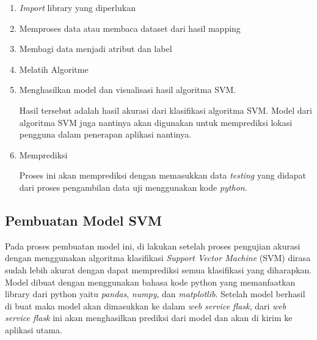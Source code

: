 \begin{enumerate}[1.]
	\itemsep0em
	\item \textit{Import} library yang diperlukan



	\item Memproses data atau membaca dataset dari hasil mapping

	\item Membagi data menjadi atribut dan label

	\item Melatih Algoritme

	\item Menghasilkan model dan visualisasi hasil algoritma SVM.
	      \par Hasil tersebut adalah hasil akurasi dari klasifikasi algoritma SVM. Model dari algoritma SVM juga nantinya akan digunakan untuk memprediksi lokasi pengguna dalam penerapan aplikasi nantinya.

	\item Memprediksi
	      \par Proses ini akan memprediksi dengan memasukkan data \textit{testing} yang didapat dari proses pengambilan data uji menggunakan kode \textit{python}.
\end{enumerate}

\subsection{Pembuatan Model SVM}
Pada proses pembuatan model ini, di lakukan setelah proses pengujian akurasi dengan menggunakan algoritma klasifikasi \textit{Support Vector Machine} (SVM) dirasa sudah lebih akurat dengan dapat memprediksi semua klasifikasi yang diharapkan. Model dibuat dengan menggunakan bahasa kode python yang memanfaatkan library dari python yaitu \textit{pandas}, \textit{numpy}, dan \textit{matplotlib}. Setelah model berhasil di buat maka model akan dimasukkan ke dalam \textit{web service flask}, dari \textit{web service flask} ini akan menghasilkan prediksi dari model dan akan di kirim ke aplikasi utama.



